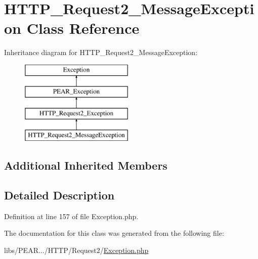\hypertarget{classHTTP__Request2__MessageException}{}\section{H\+T\+T\+P\+\_\+\+Request2\+\_\+\+Message\+Exception Class Reference}
\label{classHTTP__Request2__MessageException}
Inheritance diagram for H\+T\+T\+P\+\_\+\+Request2\+\_\+\+Message\+Exception\+:\begin{figure}[H]
\begin{center}
\leavevmode
\includegraphics[height=4.000000cm]{classHTTP__Request2__MessageException}
\end{center}
\end{figure}
\subsection*{Additional Inherited Members}


\subsection{Detailed Description}


Definition at line 157 of file Exception.\+php.



The documentation for this class was generated from the following file\+:\begin{DoxyCompactItemize}
\item 
libs/\+P\+E\+A\+R.../\+H\+T\+T\+P/\+Request2/\hyperlink{HTTP_2Request2_2Exception_8php}{Exception.\+php}\end{DoxyCompactItemize}
